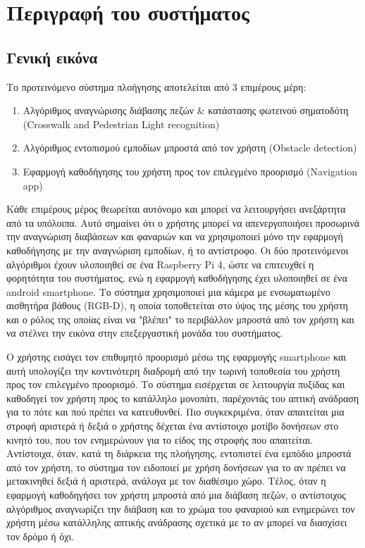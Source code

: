 \section{Περιγραφή του συστήματος}
\subsection{Γενική εικόνα}
Το προτεινόμενο σύστημα πλοήγησης αποτελείται από 3 επιμέρους μέρη:
\begin{enumerate}
    \item Αλγόριθμος αναγνώρισης διάβασης πεζών \& κατάστασης φωτεινού σηματοδότη (Crosswalk and Pedestrian Light recognition)
    \item Αλγόριθμος εντοπισμού εμποδίων μπροστά από τον χρήστη (Obstacle detection)
    \item Εφαρμογή καθοδήγησης του χρήστη προς τον επιλεγμένο προορισμό (Navigation app)
\end{enumerate}
Κάθε επιμέρους μέρος θεωρείται αυτόνομο και μπορεί να λειτουργήσει ανεξάρτητα από τα υπόλοιπα. Αυτό σημαίνει ότι ο χρήστης μπορεί να απενεργοποιήσει προσωρινά την αναγνώριση διαβάσεων και φαναριών και να χρησιμοποιεί μόνο την εφαρμογή καθοδήγησης με την αναγνώριση εμποδίων, ή το αντίστροφο. Οι δύο προτεινόμενοι αλγόριθμοι έχουν υλοποιηθεί σε ένα Raspberry Pi 4, ώστε να επιτευχθεί η φορητότητα του συστήματος, ενώ η εφαρμογή καθοδήγησης έχει υλοποιηθεί σε ένα android smartphone. Το σύστημα χρησιμοποιεί μια κάμερα με ενσωματωμένο αισθητήρα βάθους (RGB-D), η οποία τοποθετείται στο ύψος της μέσης του χρήστη και ο ρόλος της οποίας είναι να "βλέπει" το περιβάλλον μπροστά από τον χρήστη και να στέλνει την εικόνα στην επεξεργαστική μονάδα του συστήματος.

Ο χρήστης εισάγει τον επιθυμητό προορισμό μέσω της εφαρμογής smartphone και αυτή υπολογίζει την κοντινότερη διαδρομή από την τωρινή τοποθεσία του χρήστη προς τον επιλεγμένο προορισμό. Το σύστημα εισέρχεται σε λειτουργία πυξίδας και καθοδηγεί τον χρήστη προς το κατάλληλο μονοπάτι, παρέχοντάς του απτική ανάδραση για το πότε και πού πρέπει να κατευθυνθεί. Πιο συγκεκριμένα, όταν απαιτείται μια στροφή αριστερά ή δεξιά ο χρήστης δέχεται ένα αντίστοιχο μοτίβο δονήσεων στο κινητό του, που τον ενημερώνουν για το είδος της στροφής που απαιτείται. Αντίστοιχα, όταν, κατά τη διάρκεια της πλοήγησης, εντοπιστεί ένα εμπόδιο μπροστά από τον χρήστη, το σύστημα τον ειδοποιεί με χρήση δονήσεων για το αν πρέπει να μετακινηθεί δεξιά ή αριστερά, ανάλογα με τον διαθέσιμο χώρο. Τέλος, όταν η εφαρμογή καθοδηγήσει τον χρήστη μπροστά από μια διάβαση πεζών, ο αντίστοιχος αλγόριθμος αναγνωρίζει την διάβαση και το χρώμα του φαναριού και ενημερώνει τον χρήστη μέσω κατάλληλης απτικής ανάδρασης σχετικά με το αν μπορεί να διασχίσει τον δρόμο ή όχι.

